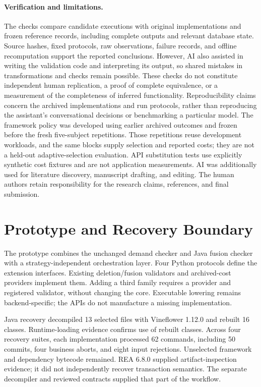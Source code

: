 \documentclass[acmsmall,screen,review,anonymous]{acmart}
\begin{document}
\paragraph{Verification and limitations.}
The checks compare candidate executions with original implementations and
frozen reference records, including complete outputs and relevant database
state. Source hashes, fixed protocols, raw observations, failure records, and
offline recomputation support the reported conclusions. However, AI also
assisted in writing the validation code and interpreting its output, so shared
mistakes in transformations and checks remain possible. These checks do not
constitute independent human replication, a proof of complete equivalence, or
a measurement of the completeness of inferred functionality. Reproducibility
claims concern the archived implementations and run protocols, rather than
reproducing the assistant's conversational decisions or benchmarking a
particular model. The framework policy was developed using earlier archived
outcomes and frozen before the fresh five-subject repetitions. Those repetitions
reuse development workloads, and the same blocks supply selection and reported
costs; they are not a held-out adaptive-selection evaluation. API substitution tests use explicitly
synthetic cost fixtures and are not application measurements. AI was additionally used for literature discovery, manuscript
drafting, and editing. The human authors retain responsibility for the
research claims, references, and final submission.

\section{Prototype and Recovery Boundary}
\label{sec:implementation}
The prototype combines the unchanged demand checker and Java fusion checker
with a strategy-independent orchestration layer. Four Python protocols define
the extension interfaces. Existing deletion/fusion validators and archived-cost
providers implement them. Adding a third family requires a provider and
registered validator, without changing the core. Executable lowering remains
backend-specific; the APIs do not manufacture a missing implementation.

Java recovery decompiled 13 selected files with Vineflower 1.12.0 and rebuilt
16 classes. Runtime-loading evidence confirms use of rebuilt classes. Across
four recovery suites, each implementation processed 62 commands, including 50
commits, four business aborts, and eight input rejections. Unselected framework
and dependency bytecode remained. REA 6.8.0 supplied artifact-inspection evidence;
it did not independently recover transaction semantics. The separate decompiler
and reviewed contracts supplied that part of the workflow.
\end{document}
